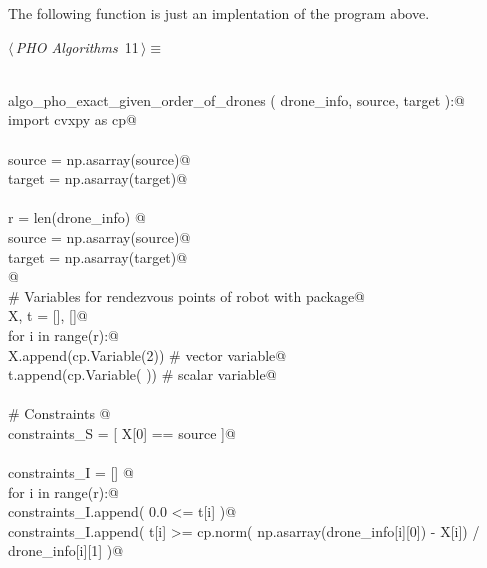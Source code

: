 \documentclass[10.0pt]{report}
\begin{document}
The following function is just an implentation of the program above. 

\begin{flushleft} \small\label{scrap5}\raggedright\small
{} $\langle\,${\itshape PHO Algorithms}\nobreak\ {\footnotesize {11}}$\,\rangle\equiv$
\vspace{-1ex}
\begin{list}{}{} \item
\mbox{}\verb@@\\
\mbox{}\verb@def algo_pho_exact_given_order_of_drones ( drone_info, source, target ):@\\
\mbox{}\verb@    import cvxpy as cp@\\
\mbox{}\verb@@\\
\mbox{}\verb@    source = np.asarray(source)@\\
\mbox{}\verb@    target = np.asarray(target)@\\
\mbox{}\verb@@\\
\mbox{}\verb@    r = len(drone_info) @\\
\mbox{}\verb@    source = np.asarray(source)@\\
\mbox{}\verb@    target = np.asarray(target)@\\
\mbox{}\verb@    @\\
\mbox{}\verb@    # Variables for rendezvous points of robot with package@\\
\mbox{}\verb@    X, t = [], []@\\
\mbox{}\verb@    for i in range(r):@\\
\mbox{}\verb@       X.append(cp.Variable(2)) # vector variable@\\
\mbox{}\verb@       t.append(cp.Variable( )) # scalar variable@\\
\mbox{}\verb@@\\
\mbox{}\verb@    # Constraints @\\
\mbox{}\verb@    constraints_S = [  X[0] == source ]@\\
\mbox{}\verb@@\\
\mbox{}\verb@    constraints_I = [] @\\
\mbox{}\verb@    for i in range(r):@\\
\mbox{}\verb@        constraints_I.append( 0.0 <= t[i] )@\\
\mbox{}\verb@        constraints_I.append( t[i] >= cp.norm( np.asarray(drone_info[i][0]) - X[i]) / drone_info[i][1] )@\\
\mbox{}\verb@@\\

\end{list}
\end{flushleft}
\end{document}
